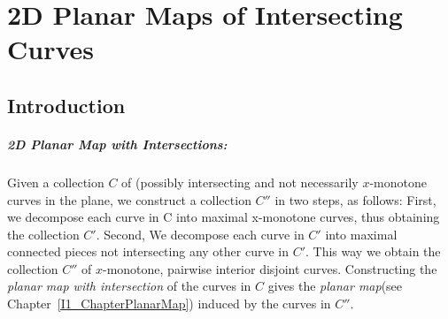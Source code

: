 
%
%
%
%
%
%
%
%
%
%
%
\chapter{2D Planar Maps of Intersecting Curves} \label{I1_ChapterPmwx}
\minitoc

\section{Introduction}

\paragraph{2D Planar Map with Intersections:} 
  Given a collection $C$ of (possibly intersecting and not necessarily
  $x$-monotone curves in the plane, we construct a collection $C''$ in
  two steps, as follows: First, we decompose each curve in C into
  maximal x-monotone curves, thus obtaining the collection
  $C'$. Second, We decompose each curve in $C'$ into maximal connected
  pieces not intersecting any other curve in $C'$.  This way we obtain
  the collection $C''$ of $x$-monotone, pairwise interior disjoint
  curves.  Constructing the {\it planar map with intersection} of the
  curves in $C$ gives the {\it planar map}(see
  Chapter~\ref{I1_ChapterPlanarMap}) induced by the curves in $C''$.

